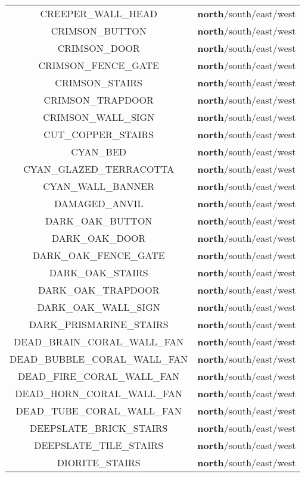 \begin{longtable}{ |c|c| }
	CREEPER\_WALL\_HEAD & \textbf{north}/south/east/west \\
	CRIMSON\_BUTTON & \textbf{north}/south/east/west \\
	CRIMSON\_DOOR & \textbf{north}/south/east/west \\
	CRIMSON\_FENCE\_GATE & \textbf{north}/south/east/west \\
	CRIMSON\_STAIRS & \textbf{north}/south/east/west \\
	CRIMSON\_TRAPDOOR & \textbf{north}/south/east/west \\
	CRIMSON\_WALL\_SIGN & \textbf{north}/south/east/west \\
	CUT\_COPPER\_STAIRS & \textbf{north}/south/east/west \\
	CYAN\_BED & \textbf{north}/south/east/west \\
	CYAN\_GLAZED\_TERRACOTTA & \textbf{north}/south/east/west \\
	CYAN\_WALL\_BANNER & \textbf{north}/south/east/west \\
	DAMAGED\_ANVIL & \textbf{north}/south/east/west \\
	DARK\_OAK\_BUTTON & \textbf{north}/south/east/west \\
	DARK\_OAK\_DOOR & \textbf{north}/south/east/west \\
	DARK\_OAK\_FENCE\_GATE & \textbf{north}/south/east/west \\
	DARK\_OAK\_STAIRS & \textbf{north}/south/east/west \\
	DARK\_OAK\_TRAPDOOR & \textbf{north}/south/east/west \\
	DARK\_OAK\_WALL\_SIGN & \textbf{north}/south/east/west \\
	DARK\_PRISMARINE\_STAIRS & \textbf{north}/south/east/west \\
	DEAD\_BRAIN\_CORAL\_WALL\_FAN & \textbf{north}/south/east/west \\
	DEAD\_BUBBLE\_CORAL\_WALL\_FAN & \textbf{north}/south/east/west \\
	DEAD\_FIRE\_CORAL\_WALL\_FAN & \textbf{north}/south/east/west \\
	DEAD\_HORN\_CORAL\_WALL\_FAN & \textbf{north}/south/east/west \\
	DEAD\_TUBE\_CORAL\_WALL\_FAN & \textbf{north}/south/east/west \\
	DEEPSLATE\_BRICK\_STAIRS & \textbf{north}/south/east/west \\
	DEEPSLATE\_TILE\_STAIRS & \textbf{north}/south/east/west \\
	DIORITE\_STAIRS & \textbf{north}/south/east/west \\

\end{longtable}
